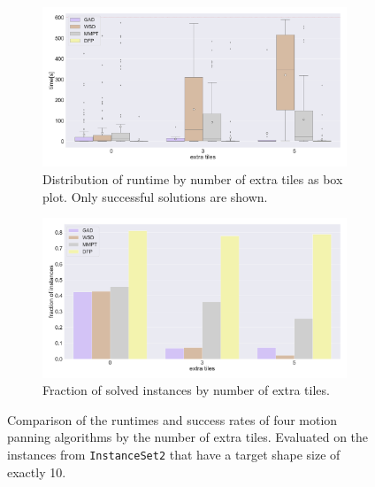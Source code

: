 \begin{figure}[htpb]
\begin{subfigure}[b]{\textwidth}
\centering
\includegraphics[width=\textwidth]{figures/plots/heuristic_solvers_i2/time_over_extra_tiles.pdf}
\caption{Distribution of runtime by number of extra tiles as box plot. Only successful solutions are shown.}
\label{fig:time_over_extra_tiles}
\end{subfigure}
\begin{subfigure}[b]{\textwidth}
\centering
\includegraphics[width=\textwidth]{figures/plots/heuristic_solvers_i2/fraction_solved_over_extra_tiles.pdf}
\caption{Fraction of solved instances by number of extra tiles.}
\label{fig:i1_extra_tiles_fraction_solved.pdf}
\end{subfigure}
\caption[Runtime and success rate of planners by number of extra tiles] {Comparison of the runtimes and success rates of four motion panning algorithms by the number of extra tiles. Evaluated on the instances from \texttt{InstanceSet2} that have a target shape size of exactly 10.}
\label{fig:i2_extra_tiles_performance}
\end{figure}

